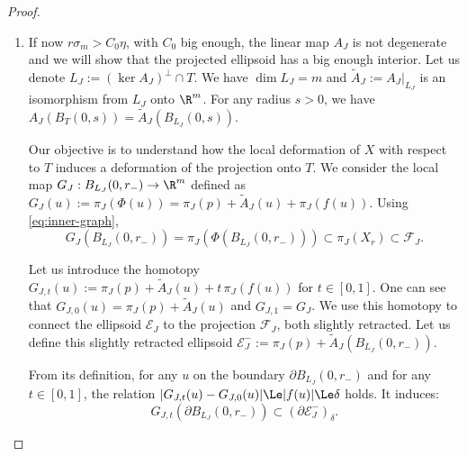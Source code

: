 \begin{proof}
\begin{enumerate}
    \item If now $r\sigma_m>C_0\eta$, with $C_0$ big enough, the
      linear map $A_J$ is not degenerate and we will show that the
      projected ellipsoid has a big enough interior.  Let us denote
      $L_J:=(\ker A_J)^\perp \cap T$. We have $\dim L_J=m$ and
      $\widetilde A_J:=A_J|_{L_J}$ is an isomorphism from $L_J$ onto
      $\R^m$. For any radius $s>0$, we have $A_J(B_T(0,s))= \widetilde
      A_J(B_{L_J}(0,s))$.

      Our objective is to understand how the local deformation of $X$
      with respect to $T$ induces a deformation of the projection onto
      $T$. We consider the local map $G_J: B_{L_J}(0,r_-)\to \R^m$
      defined as $G_J(u) := \pi_J(\Phi(u)) = \pi_J(p) + \widetilde
      A_J(u) + \pi_J(f(u))$. Using \eqref{eq:inner-graph},
      \begin{equation}
        \label{eq:G-image}
        G_J(B_{L_J}(0,r_-)) = \pi_J(\Phi(B_{L_J}(0,r_-))) \subset
        \pi_J(X_r) \subset \mathcal{F}_J.
      \end{equation}

      Let us introduce the homotopy $G_{J,t}(u) := \pi_J(p) +
      \widetilde A_J (u) + t\,\pi_J(f(u))$ for $t\in[0,1]$. One can
      see that $G_{J,0}(u) = \pi_J(p)+\widetilde A_J(u)$ and
      $G_{J,1}=G_J$. We use this homotopy to connect the ellipsoid
      $\mathcal{E}_J$ to the projection $\mathcal{F}_J$, both
      slightly retracted. Let us define this slightly retracted
      ellipsoid $\mathcal{E}_J^- := \pi_J(p) + \widetilde
      A_J(B_{L_J}(0,r_-))$.

      From its definition, for any $u$ on the boundary $\partial
      B_{L_J}(0,r_-)$ and for any $t\in[0,1]$, the relation
      $|G_{J,t}(u)-G_{J,0}(u)| \Le |f(u)| \Le \delta$ holds. It induces:
      \begin{equation}
        \label{eq:homotopy-boundary}
        G_{J,t}(\partial B_{L_J}(0,r_-))
        \subset
        (\partial\mathcal{E}_J^-)_{\delta}.
      \end{equation}


\end{enumerate}
\end{proof}
